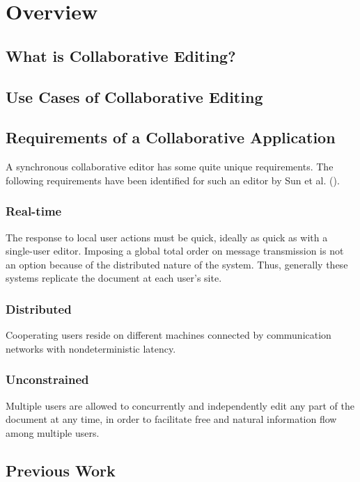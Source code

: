 \chapter{Overview}
\label{chapter:overview}



\section{What is Collaborative Editing?}



\section{Use Cases of Collaborative Editing}



\section{Requirements of a Collaborative Application}
A synchronous collaborative editor has some quite unique requirements.
The following requirements have been identified for such an editor
by Sun et al. (\cite{sun98a}).

\subsection{Real-time} 
The response to local user actions must be quick, ideally
as quick as with a single-user editor. Imposing a global total order on
message transmission is not
an option because of the distributed nature of the system. Thus, generally 
these systems replicate the document at each user's site.

\subsection{Distributed} 
Cooperating users reside on different machines 
connected by communication networks with nondeterministic latency.

\subsection{Unconstrained} 
Multiple users are allowed to concurrently and
independently edit any part of the document at any time, in order to 
facilitate free and natural information flow among multiple users.



\section{Previous Work}
\label{sect:overview.previouswork}

